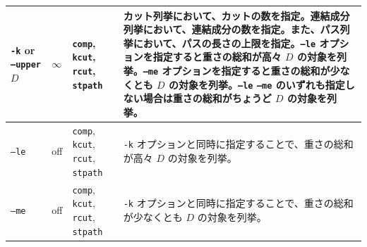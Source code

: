 \documentclass{jsarticle}
\begin{document}
\begin{table}
\begin{center}
\begin{tabular}[t]{|p{120pt}|p{50pt}|p{80pt}|p{180pt}|}
\texttt{-k} or \texttt{--upper} $D$ & $\infty$ & \texttt{comp}, \texttt{kcut}, \texttt{rcut}, \texttt{stpath} & カット列挙において、カットの数を指定。連結成分列挙において、連結成分の数を指定。また、パス列挙において、パスの長さの上限を指定。\texttt{--le} オプションを指定すると重さの総和が高々 $D$ の対象を列挙。\texttt{--me} オプションを指定すると重さの総和が少なくとも $D$ の対象を列挙。\texttt{--le}  \texttt{--me} のいずれも指定しない場合は重さの総和がちょうど $D$ の対象を列挙。 \\ \hline
\texttt{--le} & off & \texttt{comp}, \texttt{kcut}, \texttt{rcut}, \texttt{stpath} & \texttt{-k} オプションと同時に指定することで、重さの総和が高々 $D$ の対象を列挙。 \\ \hline
\texttt{--me} & off & \texttt{comp}, \texttt{kcut}, \texttt{rcut}, \texttt{stpath} & \texttt{-k} オプションと同時に指定することで、重さの総和が少なくとも $D$ の対象を列挙。 \\ \hline
\end{tabular}
\end{center}
\end{table}
\end{document}
